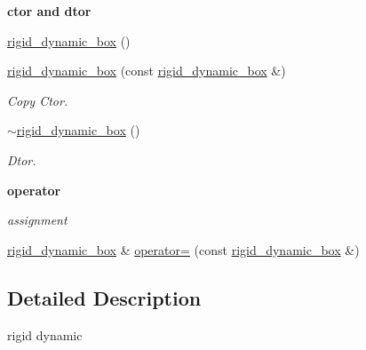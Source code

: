 \begin{Indent}{\bf ctor and dtor}\par
{\em \label{_amgrp98fbd3e5ae66fcd014fb744fec76c58d}
 }\begin{DoxyCompactItemize}
\item 
\hyperlink{classnebula_1_1content_1_1actor_1_1renderer_1_1rigid__dynamic__box_a9e5c18a11e7eda587a240afcfc6935f0}{rigid\_\-dynamic\_\-box} ()
\item 
\hyperlink{classnebula_1_1content_1_1actor_1_1renderer_1_1rigid__dynamic__box_afa4477b22f365e1945273ab2f412c900}{rigid\_\-dynamic\_\-box} (const \hyperlink{classnebula_1_1content_1_1actor_1_1renderer_1_1rigid__dynamic__box}{rigid\_\-dynamic\_\-box} \&)
\begin{DoxyCompactList}\small\item\em Copy Ctor. \item\end{DoxyCompactList}\item 
\hyperlink{classnebula_1_1content_1_1actor_1_1renderer_1_1rigid__dynamic__box_ae1ac47a34c8131b8011d636ebc9d1e72}{$\sim$rigid\_\-dynamic\_\-box} ()
\begin{DoxyCompactList}\small\item\em Dtor. \item\end{DoxyCompactList}\end{DoxyCompactItemize}
\end{Indent}
\begin{Indent}{\bf operator}\par
{\em \label{_amgrp4b583376b2767b923c3e1da60d10de59}
 assignment }\begin{DoxyCompactItemize}
\item 
\hyperlink{classnebula_1_1content_1_1actor_1_1renderer_1_1rigid__dynamic__box}{rigid\_\-dynamic\_\-box} \& \hyperlink{classnebula_1_1content_1_1actor_1_1renderer_1_1rigid__dynamic__box_a26efbc775da4307f9294dab260b43723}{operator=} (const \hyperlink{classnebula_1_1content_1_1actor_1_1renderer_1_1rigid__dynamic__box}{rigid\_\-dynamic\_\-box} \&)
\end{DoxyCompactItemize}
\end{Indent}


\subsection{Detailed Description}
rigid dynamic 

